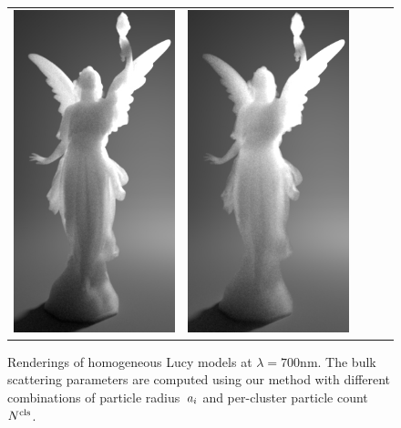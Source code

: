 \begin{figure}
\begin{tabular}{ccccc}
		\includegraphics[height=\resLen]{images/lucy/N100_500nm.jpg} &
		\includegraphics[height=\resLen]{images/lucy/N500_500nm.jpg}
	\end{tabular}
    \caption{\label{fig:lucycompare}
        Renderings of homogeneous Lucy models at $\lambda = 700\text{nm}$.
        The bulk scattering parameters are computed using our method with different combinations of particle radius~$a_i$ and per-cluster particle count~${N^\text{cls}}$.
    }
\end{figure}
